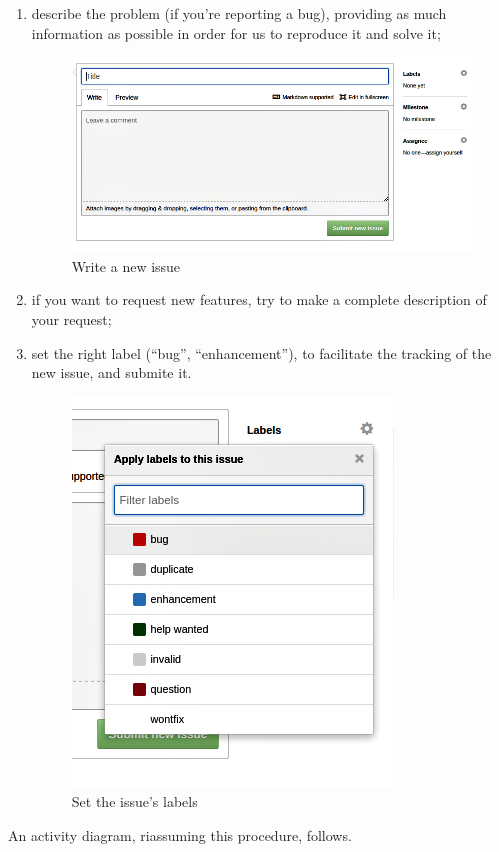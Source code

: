 \begin{enumerate}
	\item describe the problem (if you're reporting a bug), providing as much information as possible in order for us to reproduce it and solve it;
	\begin{figure}[H]
		\centering
		\includegraphics[scale=0.6]{Pics/TextIssue.jpg}
		\caption{Write a new issue}
	\end{figure}
	\item if you want to request new features, try to make a complete description of your request;
	\item set the right label (“bug”, “enhancement”), to facilitate the tracking of the new issue, and submite it.
	\begin{figure}[H]
		\centering
		\includegraphics[scale=0.6]{Pics/Labels.jpg}
		\caption{Set the issue's labels}
	\end{figure}
\end{enumerate}

An activity diagram, riassuming this procedure, follows.
